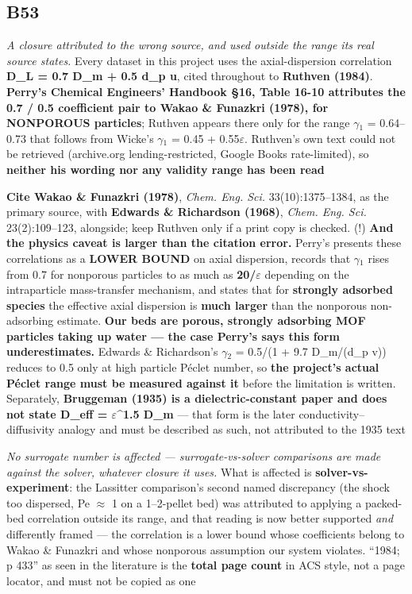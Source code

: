 \documentclass[10pt]{article}
\begin{document}
\subsection*{B53}\label{led:B53}
\begin{description}[leftmargin=0pt,itemsep=1pt]
\item[Defect.] \emph{A closure attributed to the wrong source, and used outside the range its real source states.} Every dataset in this project uses the axial-dispersion correlation \textbf{D\_L = 0.7 D\_m + 0.5 d\_p u}, cited throughout to \textbf{Ruthven (1984)}. \textbf{Perry's Chemical Engineers' Handbook §16, Table 16-10 attributes the 0.7 / 0.5 coefficient pair to Wakao \& Funazkri (1978), for NONPOROUS particles}; Ruthven appears there only for the range $\gamma$$_1$ = 0.64--0.73 that follows from Wicke's $\gamma$$_1$ = 0.45 + 0.55$\varepsilon$. Ruthven's own text could not be retrieved (archive.org lending-restricted, Google Books rate-limited), so \textbf{neither his wording nor any validity range has been read}
\item[Resolution.] \textbf{Cite Wakao \& Funazkri (1978)}, \emph{Chem. Eng. Sci.} 33(10):1375--1384, as the primary source, with \textbf{Edwards \& Richardson (1968)}, \emph{Chem. Eng. Sci.} 23(2):109--123, alongside; keep Ruthven only if a print copy is checked. (!) \textbf{And the physics caveat is larger than the citation error.} Perry's presents these correlations as a \textbf{LOWER BOUND} on axial dispersion, records that $\gamma$$_1$ rises from 0.7 for nonporous particles to as much as \textbf{20/$\varepsilon$} depending on the intraparticle mass-transfer mechanism, and states that for \textbf{strongly adsorbed species} the effective axial dispersion is \textbf{much larger} than the nonporous non-adsorbing estimate. \textbf{Our beds are porous, strongly adsorbing MOF particles taking up water --- the case Perry's says this form underestimates.} Edwards \& Richardson's $\gamma$$_2$ = 0.5/(1 + 9.7 D\_m/(d\_p v)) reduces to 0.5 only at high particle P\'eclet number, so \textbf{the project's actual P\'eclet range must be measured against it} before the limitation is written. Separately, \textbf{Bruggeman (1935) is a dielectric-constant paper and does not state D\_eff = $\varepsilon$\textasciicircum{}1.5 D\_m} --- that form is the later conductivity--diffusivity analogy and must be described as such, not attributed to the 1935 text
\item[Note.] \emph{No surrogate number is affected --- surrogate-vs-solver comparisons are made against the solver, whatever closure it uses.} What is affected is \textbf{solver-vs-experiment}: the Lassitter comparison's second named discrepancy (the shock too dispersed, Pe $\approx$ 1 on a 1--2-pellet bed) was attributed to applying a packed-bed correlation outside its range, and that reading is now better supported \emph{and} differently framed --- the correlation is a lower bound whose coefficients belong to Wakao \& Funazkri and whose nonporous assumption our system violates. ``1984; p 433'' as seen in the literature is the \textbf{total page count} in ACS style, not a page locator, and must not be copied as one
\end{description}
\end{document}
